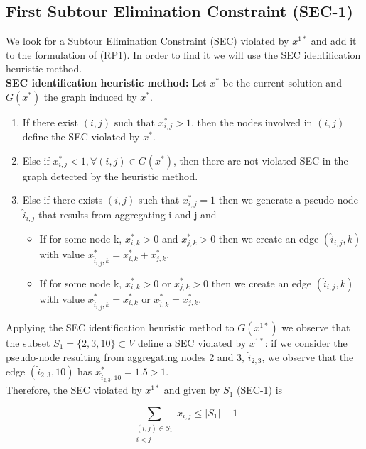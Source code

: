 \documentclass[12pt]{article}
\begin{document}
\subsection{First Subtour Elimination Constraint (SEC-1)}
We look for a Subtour Elimination Constraint (SEC) violated by $x^{1*}$ and add it to the formulation of (RP1). In order to find it we will use the SEC identification heuristic method.\\

\textbf{SEC identification heuristic method:} Let $x^{*}$ be the current solution and $G(x^{*})$ the graph induced by $x^{*}$.
\begin{enumerate}
    \item If there exist $(i,j)$ such that $x_{i,j}^{*}>1$, then the nodes involved in $(i,j)$ define the SEC violated by $x^{*}$.
    \item Else if $x_{i,j}^{*} < 1,  \forall (i,j) \in G(x^{*})$, then there are not violated SEC in the graph detected by the heuristic method.
    \item Else if there exists $(i,j)$ such that $x_{i,j}^{*} = 1$ then we generate a pseudo-node $\hat{i}_{i,j}$ that results from aggregating i and j and
    \begin{itemize}
        \item If for some node k, $x_{i,k}^{*}>0$ and $x_{j,k}^{*}>0$ then we create an edge $(\hat{i}_{i,j},k)$ with value $x_{\hat{i}_{i,j},k}^{*} = x_{i,k}^{*}+x_{j,k}^{*}$.
        \item If for some node k, $x_{i,k}^{*}>0$ or $x_{j,k}^{*}>0$ then we create an edge $(\hat{i}_{i,j},k)$ with value $x_{\hat{i}_{i,j},k}^{*} = x_{i,k}^{*}$ or $ x_{\hat{i},k}^{*} = x_{j,k}^{*}$.
    \end{itemize}
\end{enumerate}

Applying the SEC identification heuristic method to $G(x^{1*})$ we observe that the subset $S_{1} = \{2,3,10\} \subset V$ define a SEC violated by $x^{1*}$: if we consider the pseudo-node resulting from aggregating nodes 2 and 3, $\hat{i}_{2,3}$, we observe that the edge $(\hat{i}_{2,3},10)$ has $x_{\hat{i}_{2,3},10}^{*} = 1.5 > 1$. \\

Therefore, the SEC violated by $x^{1*}$ and given by $S_{1}$ (SEC-1) is

\begin{equation}
    \sum_{\substack{(i,j) \in S_{1}\\i<j}}x_{i,j} \leq |S_{1}|-1  \tag{SEC-1}
\end{equation}
\end{document}
